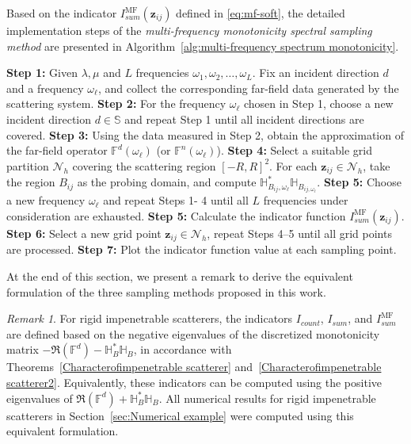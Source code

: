 \documentclass[11pt,reqno,twoside]{amsart}
\theoremstyle{definition}
\theoremstyle{remark}
\newtheorem{rem}{Remark}[section]
\numberwithin{equation}{section}
\begin{document}
Based on the indicator $I_{sum}^{\mathrm{MF}}(\mathbf{z}_{ij})$ defined in \eqref{eq:mf-soft}, the detailed implementation steps of the \emph{multi-frequency monotonicity spectral sampling method} are presented in Algorithm~\ref{alg:multi-frequency spectrum monotonicity}.



\begin{algorithm}[!htbp]
\caption{Multi-frequency monotonicity spectral sampling method}
\label{alg:multi-frequency spectrum monotonicity}
\begin{algorithmic}[1]
\State \textbf{Step 1:} Given $\lambda, \mu$ and  \(L\) frequencies $\omega_1, \omega_2, \dots, \omega_L$. Fix an incident direction $d$ and a frequency $\omega_\ell$, and collect the corresponding far-field data generated by the scattering system.
\State \textbf{Step 2:} For the frequency $\omega_\ell$ chosen in Step 1, choose a new incident direction $d \in \mathbb{S}$ and repeat Step 1 until all incident directions are covered.
\State \textbf{Step 3:} Using the data measured in Step 2, obtain the approximation  of the far-field operator $\mathbb{F}^d(\omega_\ell)$ (or $\mathbb{F}^n(\omega_\ell)$).
\State \textbf{Step 4:} Select a suitable grid partition $\mathcal{N}_h$ covering the scattering region $[-R, R]^2$. For each $\mathbf z_{ij} \in \mathcal{N}_h$, take the region $B_{ij}$ as the probing domain, and compute $\mathbb{H}_{B_{ij},\omega_\ell}^* \mathbb{H}_{B_{ij,\omega_\ell}}$.
\State \textbf{Step 5:} Choose a new frequency $\omega_\ell$ and repeat Steps 1- 4 until all $L$ frequencies under consideration are exhausted.
\State \textbf{Step 5:} Calculate the indicator function \( I_{sum}^{\mathrm{MF}}(\mathbf z_{ij}) \).
\State \textbf{Step 6:} Select a new grid point $\mathbf z_{ij} \in \mathcal{N}_h$, repeat Steps 4–5 until all grid points are processed.
\State \textbf{Step 7:} Plot the indicator function value at each sampling point.
\end{algorithmic}
\end{algorithm}

At the end of this section, we present a remark to derive the equivalent formulation of the three sampling methods proposed in this work.

\begin{rem}
For rigid impenetrable scatterers, the indicators $I_{count}$, $I_{sum}$, and $I_{sum}^{\mathrm{MF}}$ are defined based on the negative eigenvalues of the discretized monotonicity matrix $-\Re(\mathbb{F}^d)-\mathbb{H}_B^*\mathbb{H}_B$, in accordance with Theorems~\ref{Characterofimpenetrable scatterer} and~\ref{Characterofimpenetrable scatterer2}. Equivalently, these indicators can be computed using the positive eigenvalues of $\Re(\mathbb{F}^d)+\mathbb{H}_B^*\mathbb{H}_B$. All numerical results for rigid impenetrable scatterers in Section~\ref{sec:Numerical example} were computed using this equivalent formulation.
\end{rem}
\end{document}
